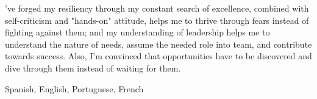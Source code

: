 
\begin{cvparagraph}
	've forged my resiliency through my constant search of excellence, combined with self-criticism and "hands-on" attitude, helps me to thrive through fears instead of fighting against them; and my understanding of leadership helps me to understand the nature of needs, assume the needed role into team, and contribute towards success. Also, I'm convinced that opportunities have to be discovered and dive through them instead of waiting for them.
\end{cvparagraph}


\begin{cvparagraph}
	{Spanish, English, Portuguese, French} %
\end{cvparagraph}

